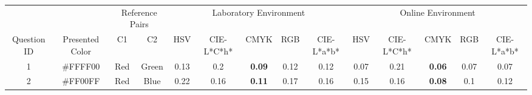 \begin{table}[!htbp]
  \centering
  \resizebox{0.8\textwidth}{!} {
  \begin{tabular}{@{}cccccccccccccc@{}}
                                  &                                                       & \multicolumn{2}{c}{Reference Pairs}                         & \multicolumn{5}{c}{Laboratory Environment}                                                                                                                                                                                                                                      & \multicolumn{5}{c}{Online Environment}                                                                                                                                                                                                                                                                         \\ \cmidrule(l){3-14}
    \multirow{-2}{*}{Question ID} & \multirow{-2}{*}{Presented Color}                     & C1                           & \multicolumn{1}{c|}{C2}      & HSV                                                         & CIE-L*C*h*                                                 & CMYK                                                       & RGB                        & \multicolumn{1}{c||}{CIE-L*a*b*}                            & HSV                                                        & CIE-L*C*h*                                                 & CMYK                                                       & RGB                                                        & \multicolumn{1}{c|}{CIE-L*a*b*}                            \\ \midrule
    \multicolumn{1}{c}{1}       & \multicolumn{1}{c}{\cellcolor[HTML]{FFFF00}\#FFFF00} & \multicolumn{1}{c|}{Red}     & \multicolumn{1}{c|}{Green}   & \multicolumn{1}{c|}{0.13}                                   & \multicolumn{1}{c|}{0.2}                                   & \multicolumn{1}{c|}{\cellcolor[HTML]{32CB00}\textbf{0.09}} & \multicolumn{1}{c|}{0.12}  & \multicolumn{1}{c||}{0.12}                                  & \multicolumn{1}{c|}{0.07}                                  & \multicolumn{1}{c|}{0.21}                                  & \multicolumn{1}{c|}{\cellcolor[HTML]{32CB00}\textbf{0.06}} & \multicolumn{1}{c|}{0.07}                                  & \multicolumn{1}{c|}{0.07}                                  \\ \midrule
    \multicolumn{1}{c}{2}       & \multicolumn{1}{c}{\cellcolor[HTML]{FF00FF}\#FF00FF} & \multicolumn{1}{c|}{Red}     & \multicolumn{1}{c|}{Blue}    & \multicolumn{1}{c|}{0.22}                                   & \multicolumn{1}{c|}{0.16}                                  & \multicolumn{1}{c|}{\cellcolor[HTML]{32CB00}\textbf{0.11}} & \multicolumn{1}{c|}{0.17}  & \multicolumn{1}{c||}{0.16}                                  & \multicolumn{1}{c|}{0.15}                                  & \multicolumn{1}{c|}{0.16}                                  & \multicolumn{1}{c|}{\cellcolor[HTML]{32CB00}\textbf{0.08}} & \multicolumn{1}{c|}{0.1}                                   & \multicolumn{1}{c|}{0.12}                                  \\ \midrule

\end{tabular}}
\end{table}
